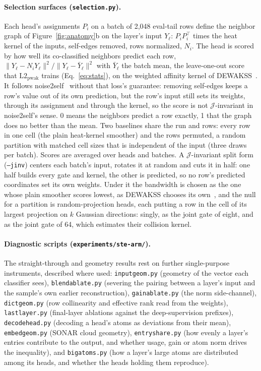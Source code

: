 \paragraph{Selection surfaces (\texttt{selection.py}).}
Each head's assignments $P_i$ on a batch of 2{,}048 eval-tail rows define
the neighbor graph of Figure~\ref{fig:anatomy}b on the layer's input
$Y_\ell$: $P_iP_i^\top$ times the heat kernel of the inputs, self-edges
removed, rows normalized, $N_i$. The head is scored by how well its
co-classified neighbors predict each row,
$\lVert Y_\ell - N_iY_\ell\rVert^2/\lVert Y_\ell - \bar{Y}_\ell\rVert^2$
with $\bar{Y}_\ell$ the batch mean, the leave-one-out score that
$\mathrm{L2}_{\mathrm{pwak}}$ trains (Eq.~\eqref{eq:stats}), on the
weighted affinity kernel of DEWAKSS~\cite{tjarnberg2021}. It follows
noise2self~\cite{batson2019} without that loss's guarantee: removing
self-edges keeps a row's value out of its own prediction, but the row's
input still sets its weights, through its assignment and through the
kernel, so the score is not $\mathcal{J}$-invariant in noise2self's
sense. 0 means the
neighbors predict a row exactly, 1 that the graph does no better than the
mean. Two baselines share the run and rows: every row in one cell (the
plain heat-kernel smoother) and the rows permuted, a random partition with
matched cell sizes that is independent of the input (three draws per
batch). Scores are averaged over heads and batches. A
$\mathcal{J}$-invariant split form (\texttt{--jinv}) centers each batch's
input, rotates it at random and cuts it in half: one half builds every
gate and kernel, the other is predicted, so no row's predicted
coordinates set its own weights. Under it the bandwidth is chosen as the
one whose plain smoother scores lowest, as DEWAKSS chooses its
own~\cite{tjarnberg2021}, and the null for a partition is
random-projection heads, each putting a row in the cell of its largest
projection on $k$ Gaussian directions: singly, as the joint gate of
eight, and as the joint gate of 64, which estimates their collision
kernel.

\paragraph{Diagnostic scripts (\texttt{experiments/ste-arm/}).}
The straight-through and geometry results rest on further single-purpose
instruments, described where used: \texttt{inputgeom.py} (geometry of the
vector each classifier sees), \texttt{blendablate.py} (severing the
pairing between a layer's input and the sample's own earlier
reconstruction), \texttt{gainablate.py} (the norm side-channel),
\texttt{dictgeom.py} (row collinearity and effective rank read from the
weights), \texttt{lastlayer.py} (final-layer ablations against the
deep-supervision prefixes), \texttt{decodehead.py} (decoding a head's
atoms as deviations from their mean), \texttt{embedgeom.py} (SONAR
cloud geometry), \texttt{entryshare.py} (how evenly a layer's entries
contribute to the output, and whether usage, gain or atom norm drives the
inequality), and \texttt{bigatoms.py} (how a layer's large atoms are
distributed among its heads, and whether the heads holding them
reproduce).

